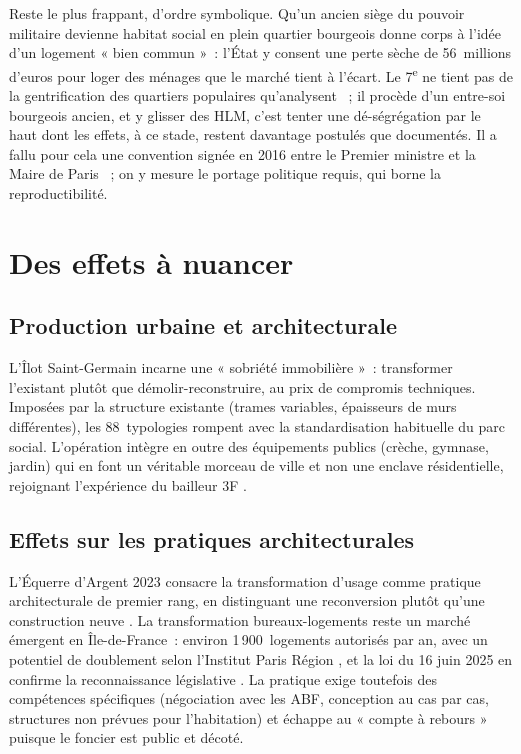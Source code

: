 \documentclass[a4paper,12pt]{article}
\begin{document}
Reste le plus frappant, d'ordre symbolique. Qu'un ancien siège du pouvoir militaire devienne habitat social en plein quartier bourgeois donne corps à l'idée d'un logement « bien commun »~: l'État y consent une perte sèche de 56~millions d'euros pour loger des ménages que le marché tient à l'écart. Le 7\textsuperscript{e} ne tient pas de la gentrification des quartiers populaires qu'analysent \textcite{ClervalFleury2009Gentrification}~; il procède d'un entre-soi bourgeois ancien, et y glisser des HLM, c'est tenter une dé-ségrégation par le haut dont les effets, à ce stade, restent davantage postulés que documentés. Il a fallu pour cela une convention signée en 2016 entre le Premier ministre et la Maire de Paris \parencite{BanqueDesTerritoires2018IlotSG}~; on y mesure le portage politique requis, qui borne la reproductibilité.

\section{Des effets à nuancer}

\subsection{Production urbaine et architecturale}

L'Îlot Saint-Germain incarne une « sobriété immobilière »~: transformer l'existant plutôt que démolir-reconstruire, au prix de compromis techniques. Imposées par la structure existante (trames variables, épaisseurs de murs différentes), les 88~typologies rompent avec la standardisation habituelle du parc social. L'opération intègre en outre des équipements publics (crèche, gymnase, jardin) qui en font un véritable morceau de ville et non une enclave résidentielle, rejoignant l'expérience du bailleur 3F \parencite{Ekopolis2025IlotSG, Alterea2023IlotSG}.

\subsection{Effets sur les pratiques architecturales}

L'Équerre d'Argent 2023 consacre la transformation d'usage comme pratique architecturale de premier rang, en distinguant une reconversion plutôt qu'une construction neuve \parencite{OrdreArchitectes2023EquerreArgent}. La transformation bureaux-logements reste un marché émergent en Île-de-France~: environ 1\,900~logements autorisés par an, avec un potentiel de doublement selon l'Institut Paris Région \parencite{InstitutParisRegion2023Reconvertir}, et la loi du 16 juin 2025 en confirme la reconnaissance législative \parencite{ViePublique2025TransformationBureaux}. La pratique exige toutefois des compétences spécifiques (négociation avec les ABF, conception au cas par cas, structures non prévues pour l'habitation) et échappe au « compte à rebours » puisque le foncier est public et décoté.
\end{document}
